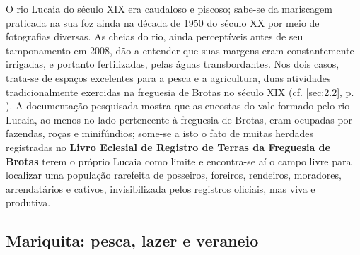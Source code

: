 O rio Lucaia do século XIX era caudaloso e piscoso; sabe-se da mariscagem praticada na sua foz ainda na década de 1950 do século XX por meio de fotografias diversas. As cheias do rio, ainda perceptíveis antes de seu tamponamento em 2008, dão a entender que suas margens eram constantemente irrigadas, e portanto fertilizadas, pelas águas transbordantes. Nos dois casos, trata-se de espaços excelentes para a pesca e a agricultura, duas atividades tradicionalmente exercidas na freguesia de Brotas no século XIX (cf. \autoref{sec:2.2}, p. \pageref{sec:2.2}). A documentação pesquisada mostra que as encostas do vale formado pelo rio Lucaia, ao menos no lado pertencente à freguesia de Brotas, eram ocupadas por fazendas, roças e minifúndios; some-se a isto o fato de muitas herdades registradas no \textbf{Livro Eclesial de Registro de Terras da Freguesia de Brotas} terem o próprio Lucaia como limite e encontra-se aí o campo livre para localizar uma população rarefeita de posseiros, foreiros, rendeiros, moradores, arrendatários e cativos, invisibilizada pelos registros oficiais, mas viva e produtiva.

\subsection{Mariquita: pesca, lazer e veraneio}\label{subsec:mariq}


